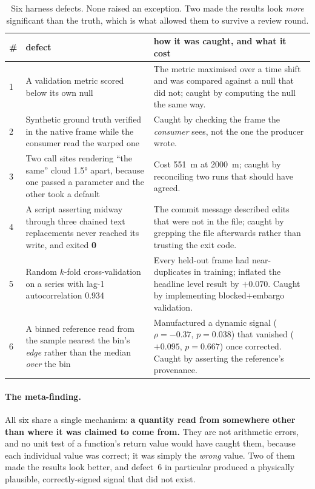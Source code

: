 \documentclass[11pt,a4paper]{article}
\newcommand{\rhoS}{\ensuremath{\rho}}
\begin{document}
\begin{table}[t]
\centering
\caption{Six harness defects. None raised an exception. Two made the results look
\emph{more} significant than the truth, which is what allowed them to survive a review round.}
\label{tab:harness}
\scriptsize
\begin{tabular}{@{}p{}p{}p{}@{}}
\toprule
\# & defect & how it was caught, and what it cost \\
\midrule
1 & A validation metric scored below its own null & The metric maximised over a time shift and
  was compared against a null that did not; caught by computing the null the same way. \\
2 & Synthetic ground truth verified in the native frame while the consumer read the warped one
  & Caught by checking the frame the \emph{consumer} sees, not the one the producer wrote. \\
3 & Two call sites rendering ``the same'' cloud \ang{1.5} apart, because one passed a parameter
  and the other took a default & Cost \SI{551}{\metre} at \SI{2000}{\metre}; caught by
  reconciling two runs that should have agreed. \\
4 & A script asserting midway through three chained text replacements never reached its write,
  and exited \textbf{0} & The commit message described edits that were not in the file; caught
  by grepping the file afterwards rather than trusting the exit code. \\
5 & Random $k$-fold cross-validation on a series with lag-1 autocorrelation \SI{0.934}{} &
  Every held-out frame had near-duplicates in training; inflated the headline level result by
  $+0.070$. Caught by implementing blocked+embargo validation. \\
6 & A binned reference read from the sample nearest the bin's \emph{edge} rather than the median
  \emph{over} the bin & Manufactured a dynamic signal ($\rhoS=-0.37$, $p=0.038$) that vanished
  ($+0.095$, $p=0.667$) once corrected. Caught by asserting the reference's provenance. \\
\bottomrule
\end{tabular}
\end{table}

\paragraph{The meta-finding.} All six share a single mechanism:
\textbf{a quantity read from somewhere other than where it was claimed to come from.} They are
not arithmetic errors, and no unit test of a function's return value would have caught them,
because each individual value was correct; it was simply the \emph{wrong} value. Two of them
made the results look better, and defect~6 in particular produced a physically plausible,
correctly-signed signal that did not exist.
\end{document}
